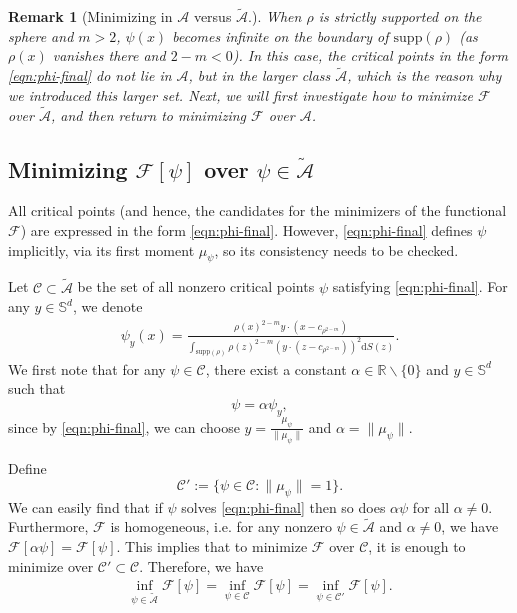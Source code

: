 \documentclass[11pt]{amsart}
\newtheorem{remark}{Remark}[section]
\newcommand{\bbr}{\mathbb R}
\newcommand{\bbs}{\mathbb S}
\newcommand{\calA}{\mathcal{A}}
\newcommand{\calC}{\mathcal{C}}
\newcommand{\calF}{\mathcal{F}}
\newcommand{\dz}{\mathrm{d}S (z)}
\newcommand{\supp}{\mathrm{supp}(\rho)}
\newcommand{\dm}{d} %
\begin{document}
\begin{remark}[Minimizing in $\calA$ versus $\tilde{\calA}$.] 
\label{rmk:minA}
When $\rho$ is strictly supported on the sphere and $m>2$, $\psi(x)$ becomes infinite on the boundary of $\supp$ (as $\rho(x)$ vanishes there and $2-m<0$). In this case, the critical points in the form \eqref{eqn:phi-final} do not lie in $\calA$, but in the larger class $\tilde{\calA}$, which is the reason why we introduced this larger set. Next, we will first investigate how to minimize $\calF$ over $\tilde{\calA}$, and then return to minimizing $\calF$ over $\calA$.
\end{remark}


\subsection{Minimizing $\calF[\psi]$ over $\psi \in \tilde{\calA}$}
All critical points (and hence, the candidates for the minimizers of the functional $\calF$) are expressed in the form \eqref{eqn:phi-final}. However, \eqref{eqn:phi-final} defines $\psi$ implicitly, via its first moment $\mu_\psi$, so its consistency needs to be checked.

Let $\mathcal{C} \subset \tilde{\mathcal{A}}$ be the set of all nonzero critical points $\psi$ satisfying \eqref{eqn:phi-final}. For any $y\in\bbs^\dm$, we denote 
\begin{align}\label{eqn:phicy}
\psi_y(x)=\frac{\rho(x)^{2-m}y\cdot(x-c_{\rho^{2-m}})}{\int_{\supp}\rho(z)^{2-m}\left(y\cdot (z-c_{\rho^{2-m}})\right)^2\dz}.
\end{align}
We first note that for any $\psi \in\mathcal{C}$, there exist a constant $\alpha\in\bbr\backslash\{0\}$ and $y\in\bbs^\dm$ such that
\[
\psi=\alpha\psi_{y},
\]
since by \eqref{eqn:phi-final}, we can choose $y=\frac{\mu_\psi}{\|\mu_\psi\|}$ and $\alpha=\|\mu_\psi\|$.

Define
\begin{equation}
\label{eqn:Cprime}
\mathcal{C}':=\{\psi \in\mathcal{C}:\|\mu_\psi\|=1\}.
\end{equation}
We can easily find that if $\psi$ solves \eqref{eqn:phi-final} then so does $\alpha\psi$ for all $\alpha\neq0$. Furthermore, $\mathcal{F}$ is homogeneous, i.e. for any nonzero $\psi \in\tilde{\mathcal{A}}$ and $\alpha\neq0$, we have $\mathcal{F}[\alpha\psi]=\mathcal{F}[\psi]$. This implies that to minimize $\calF$ over $\calC$, it is enough to minimize over $\calC' \subset \calC$. Therefore, we have
\begin{align}
\label{infequiv}
\inf_{\psi \in\mathcal{\tilde{A}}}\mathcal{F}[\psi]=\inf_{\psi\in\mathcal{C}}\mathcal{F}[\psi]=\inf_{ \psi \in\mathcal{C}'}\mathcal{F}[\psi].
\end{align}
\end{document}
